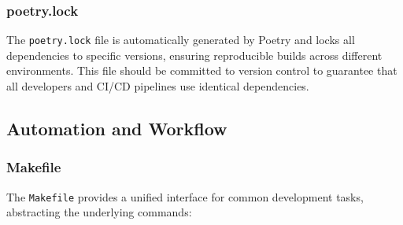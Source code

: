 \subsubsection{poetry.lock}
The \texttt{poetry.lock} file is automatically generated by Poetry and locks all dependencies to specific versions, ensuring reproducible builds across different environments. This file should be committed to version control to guarantee that all developers and CI/CD pipelines use identical dependencies.

\subsection{Automation and Workflow}

\subsubsection{Makefile}
The \texttt{Makefile} provides a unified interface for common development tasks, abstracting the underlying commands:


